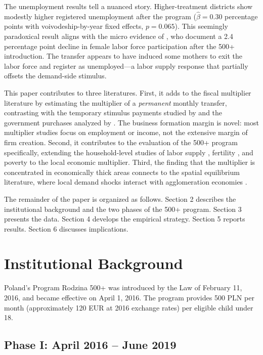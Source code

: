 \documentclass[12pt]{article}
\begin{document}
The unemployment results tell a nuanced story. Higher-treatment districts show modestly higher registered unemployment after the program ($\hat{\beta} = 0.30$ percentage points with voivodeship-by-year fixed effects, $p = 0.065$). This seemingly paradoxical result aligns with the micro evidence of \citet{myck2019labour}, who document a 2.4 percentage point decline in female labor force participation after the 500+ introduction. The transfer appears to have induced some mothers to exit the labor force and register as unemployed---a labor supply response that partially offsets the demand-side stimulus.

This paper contributes to three literatures. First, it adds to the fiscal multiplier literature by estimating the multiplier of a \emph{permanent} monthly transfer, contrasting with the temporary stimulus payments studied by \citet{parker2013consumer} and the government purchases analyzed by \citet{nakamura2014fiscal}. The business formation margin is novel: most multiplier studies focus on employment or income, not the extensive margin of firm creation. Second, it contributes to the evaluation of the 500+ program specifically, extending the household-level studies of labor supply \citep{myck2019labour}, fertility \citep{gromadzki2024fertility}, and poverty \citep{myck2024poverty} to the local economic multiplier. Third, the finding that the multiplier is concentrated in economically thick areas connects to the spatial equilibrium literature, where local demand shocks interact with agglomeration economies \citep{kline2010place, busso2013assessing}.

The remainder of the paper is organized as follows. Section 2 describes the institutional background and the two phases of the 500+ program. Section 3 presents the data. Section 4 develops the empirical strategy. Section 5 reports results. Section 6 discusses implications.


\section{Institutional Background}

Poland's Program Rodzina 500+ was introduced by the Law of February 11, 2016, and became effective on April 1, 2016. The program provides 500 PLN per month (approximately 120 EUR at 2016 exchange rates) per eligible child under 18.

\subsection{Phase I: April 2016 -- June 2019}
\end{document}
